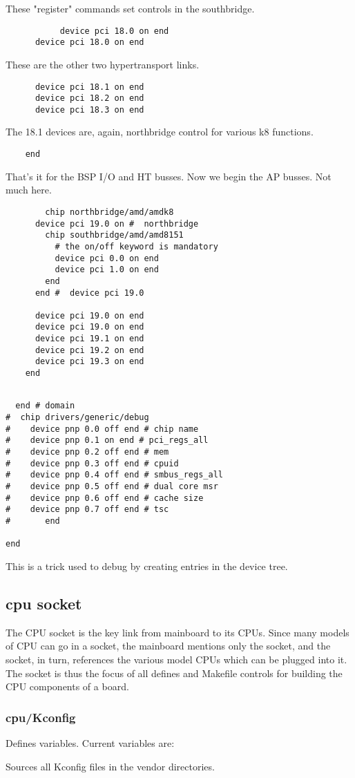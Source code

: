 \documentclass[10pt,letterpaper]{article}
\begin{document}
These "register" commands set controls in the southbridge.
\begin{verbatim}
           device pci 18.0 on end
      device pci 18.0 on end
\end{verbatim}
These are the other two hypertransport links.
\begin{verbatim}
      device pci 18.1 on end
      device pci 18.2 on end
      device pci 18.3 on end
\end{verbatim}
The 18.1 devices are, again, northbridge control for various k8 functions.
\begin{verbatim}
    end
  \end{verbatim}
That's it for the BSP I/O and HT busses. Now we begin the AP busses. Not much here.
\begin{verbatim}
        chip northbridge/amd/amdk8
      device pci 19.0 on #  northbridge
        chip southbridge/amd/amd8151
          # the on/off keyword is mandatory
          device pci 0.0 on end
          device pci 1.0 on end
        end
      end #  device pci 19.0

      device pci 19.0 on end
      device pci 19.0 on end
      device pci 19.1 on end
      device pci 19.2 on end
      device pci 19.3 on end
    end


\end{verbatim}
\begin{verbatim}
  end # domain
#  chip drivers/generic/debug
#    device pnp 0.0 off end # chip name
#    device pnp 0.1 on end # pci_regs_all
#    device pnp 0.2 off end # mem
#    device pnp 0.3 off end # cpuid
#    device pnp 0.4 off end # smbus_regs_all
#    device pnp 0.5 off end # dual core msr
#    device pnp 0.6 off end # cache size
#    device pnp 0.7 off end # tsc
#       end

end
\end{verbatim}
This is a trick used to debug by creating entries in the device tree.

\subsection{cpu socket}
The CPU socket is the key link from mainboard to its CPUs. Since many models of CPU can go in a socket, the mainboard mentions only
the socket, and the socket, in turn, references the various model CPUs which can be plugged into it. The socket is thus the focus
of all defines and Makefile controls for building the CPU components of a board.

\subsubsection{ cpu/Kconfig}
Defines variables. Current variables are:

Sources all Kconfig files in the vendor directories.
\end{document}
